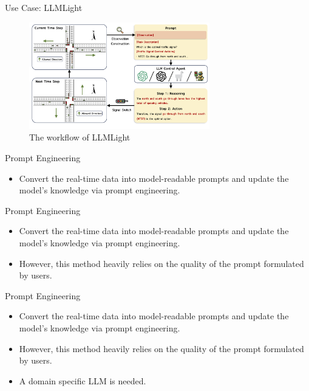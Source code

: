 \documentclass[t]{beamer}
\begin{document}
\begin{frame}{Use Case: LLMLight}
  \begin{figure}
    \centering
    \includegraphics[width=0.7\textwidth]{LLMLight.PNG}
    \caption{The workflow of LLMLight \cite{Lai23}}
    \label{fig:llmlight}
\end{figure}
\end{frame}

\begin{frame}{Prompt Engineering}
  \vspace{1cm}
  \begin{itemize}
    \item Convert the real-time data into model-readable prompts and update the model’s knowledge via prompt engineering.
  \end{itemize}
\end{frame}

\begin{frame}{Prompt Engineering}
  \vspace{1cm}
  \begin{itemize}
    \item Convert the real-time data into model-readable prompts and update the model’s knowledge via prompt engineering.
    \newline
    \item However, this method heavily relies on the quality of the prompt formulated by users.
  \end{itemize}
\end{frame}

\begin{frame}{Prompt Engineering}
  \vspace{1cm}
  \begin{itemize}
    \item Convert the real-time data into model-readable prompts and update the model’s knowledge via prompt engineering.
    \newline
    \item However, this method heavily relies on the quality of the prompt formulated by users.
    \newline
    \item A domain specific LLM is needed.
  \end{itemize}
\end{frame}
\end{document}
